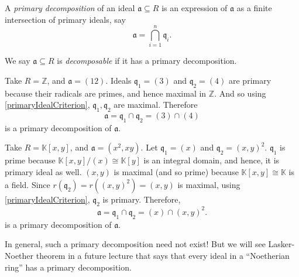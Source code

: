 \begin{definition}
    A \emph{primary decomposition} of an ideal \( \mathfrak{a} \subseteq R \) is an expression of \( \mathfrak{a} \) as a finite intersection of primary ideals, say
    \[
        \mathfrak{a} = \bigcap_{i=1}^n  \mathfrak{q}_i.
    \] 
\end{definition}
We say \( \mathfrak{a} \subseteq R \) is \emph{decomposable} if it has a primary decomposition.  
\begin{example}
  Take \( R = \mathbb{Z} \), and \( \mathfrak{a} = (12) \). Ideals \( \mathfrak{q}_1 = (3) \) and \( \mathfrak{q}_2 = (4) \) are primary because their radicals are primes, and hence maximal in \( \mathbb{Z} \). And so using \autoref{primaryIdealCriterion}, \( \mathfrak{q}_1, \mathfrak{q}_2 \) are maximal. Therefore
 \[
     \mathfrak{a} = \mathfrak{q}_1 \cap \mathfrak{q}_2 = (3) \cap (4)
 \]
 is a primary decomposition of \( \mathfrak{a} \).
\end{example}
\begin{example}\label{PrimaryDecomexample2}
  Take \( R = \mathbb{K}[x, y] \), and \( \mathfrak{a} = (x^2, xy) \). Let \( \mathfrak{q}_1 = (x) \) and \( \mathfrak{q}_2 = (x, y)^2 \). \( \mathfrak{q}_1 \) is prime because \( \mathbb{K}[x,y] / (x) \cong \mathbb{K}[y] \) is an integral domain, and hence, it is primary ideal as well. \( (x, y) \) is maximal (and so prime) because \( \mathbb{K}[x, y] \cong \mathbb{K} \) is a field. Since \( r(\mathfrak{q}_2) = r((x,y)^2) = (x,y)\) is maximal, using \autoref{primaryIdealCriterion}, \( \mathfrak{q}_2 \) is primary. Therefore,
     \[
         \mathfrak{a} = \mathfrak{q}_1 \cap \mathfrak{q}_2 = (x) \cap (x, y)^2.
     \]
     is a primary decomposition of \( \mathfrak{a} \).
\end{example}
In general, such a primary decomposition need not exist! But we will see Lasker-Noether theorem in a future lecture that says that every ideal in a ``Noetherian ring'' has a primary decomposition.

